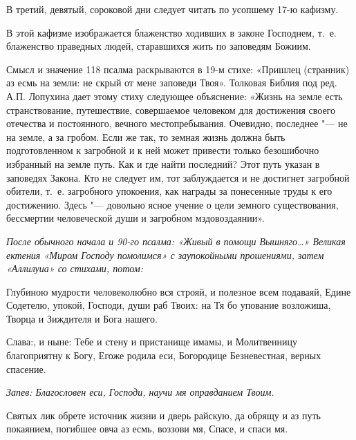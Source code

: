 В третий, девятый, сороковой дни следует читать по усопшему 17-ю кафизму. 

В этой кафизме изображается блаженство ходивших в законе Господнем, т.~е. блаженство праведных людей, старавшихся жить по заповедям Божиим. 

Смысл и значение 118 псалма раскрываются в 19-м стихе: «Пришлец (странник) аз есмь на земли: не скрый от мене заповеди Твоя». Толковая Библия под ред. А.П. Лопухина дает этому стиху следующее объяснение: «Жизнь на земле есть странствование, путешествие, совершаемое человеком для достижения своего отечества и постоянного, вечного местопребывания. Очевидно, последнее "--- не на земле, а за гробом. Если же так, то земная жизнь должна быть подготовленном к загробной и к ней может привести только безошибочно избранный на земле путь. Как и где найти последний? Этот путь указан в заповедях Закона. Кто не следует им, тот заблуждается и не достигнет загробной обители, т.~е. загробного упокоения, как награды за понесенные труды к его достижению. Здесь "--- довольно ясное учение о цели земного существования, бессмертии человеческой души и загробном мздовоздаянии». 

\normalfont{} 
\mychapterending

 


\itshape После обычного начала и 90-го псалма:\normalfont{} «Живый в помощи Вышняго…» \itshape Великая ектения\normalfont{} «Миром Господу помолимся» \itshape с заупокойными прошениями, затем\normalfont{} «Аллилуиа» \itshape со стихами, потом:\normalfont{}




Глубиною мудрости человеколюбно вся строяй, и полезное всем подаваяй, Едине Содетелю, упокой, Господи, души раб Твоих: на Тя бо упование возложиша, Творца и Зиждителя и Бога нашего. 

Слава:, и ныне: Тебе и стену и пристанище имамы, и Молитвенницу благоприятну к Богу, Егоже родила еси, Богородице Безневестная, верных спасение.




\itshape Запев:\normalfont{} Благословен еси, Господи, научи мя оправданием Твоим. 

Святых лик обрете источник жизни и дверь райскую, да обрящу и аз путь покаянием, погибшее овча аз есмь, воззови мя, Спасе, и спаси мя. 

